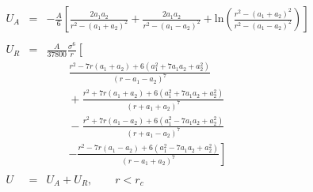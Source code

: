 


\begin{eqnarray}
U_A &=& - \frac{A}{6} \left[
	\frac{2 a_1 a_2}{r^2-\left(a_1+a_2\right)^2}
	+ \frac{2 a_1 a_2}{r^2 - \left(a_1 - a_2\right)^2}
	+ \mathrm{ln}
				\left( 
					\frac{r^2-\left(a_1+a_2\right)^2}{r^2-\left(a_1-a_2\right)^2}
				\right)
\right] \nonumber \\
\nonumber \\
U_R &=& \frac{A}{37800}  \frac{\sigma^6}{r}
\left[ \frac{}{} \right. \nonumber \\
	&&\qquad		\frac{r^2-7r\left(a_1+a_2\right)+6\left(a_1^2+7a_1a_2+a_2^2\right)}
					{\left(r-a_1-a_2\right)^7} \nonumber \\
	&&\qquad		+\frac{r^2+7r\left(a_1+a_2\right)+6\left(a_1^2+7a_1a_2+a_2^2\right)}
					{\left(r+a_1+a_2\right)^7} \nonumber \\
	&&\qquad		-\frac{r^2+7r\left(a_1-a_2\right)+6\left(a_1^2-7a_1a_2+a_2^2\right)}
					{\left(r+a_1-a_2\right)^7} \nonumber \\
	&&\qquad	\left.	-\frac{r^2-7r\left(a_1-a_2\right)+6\left(a_1^2-7a_1a_2+a_2^2\right)}
					{\left(r-a_1+a_2\right)^7}
\right] \nonumber \\
\nonumber \\
U &=& U_A + U_R, \qquad r < r_c \nonumber
\end{eqnarray}



